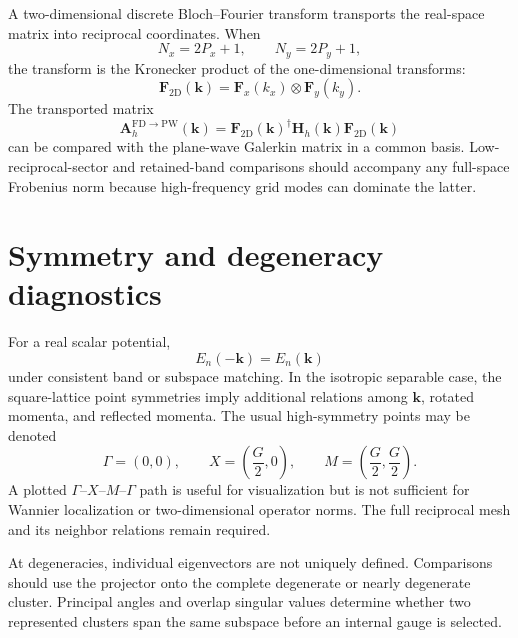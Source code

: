 A two-dimensional discrete Bloch--Fourier transform transports the real-space
matrix into reciprocal coordinates. When
\begin{equation}
    N_x=2P_x+1,
    \qquad
    N_y=2P_y+1,
\end{equation}
the transform is the Kronecker product of the one-dimensional transforms:
\begin{equation}
    \mathbf F_{2\mathrm D}(\mathbf k)
    =
    \mathbf F_x(k_x)\otimes\mathbf F_y(k_y).
\end{equation}
The transported matrix
\begin{equation}
    \mathbf A_h^{\mathrm{FD}\rightarrow\mathrm{PW}}(\mathbf k)
    =
    \mathbf F_{2\mathrm D}(\mathbf k)^\dagger
    \mathbf H_h(\mathbf k)
    \mathbf F_{2\mathrm D}(\mathbf k)
\end{equation}
can be compared with the plane-wave Galerkin matrix in a common basis.
Low-reciprocal-sector and retained-band comparisons should accompany any
full-space Frobenius norm because high-frequency grid modes can dominate the
latter.

\section*{Symmetry and degeneracy diagnostics}

For a real scalar potential,
\begin{equation}
    E_n(-\mathbf k)=E_n(\mathbf k)
\end{equation}
under consistent band or subspace matching. In the isotropic separable case,
the square-lattice point symmetries imply additional relations among
$\mathbf k$, rotated momenta, and reflected momenta. The usual high-symmetry
points may be denoted
\begin{equation}
    \Gamma=(0,0),
    \qquad
    X=\left(\frac{G}{2},0\right),
    \qquad
    M=\left(\frac{G}{2},\frac{G}{2}\right).
\end{equation}
A plotted $\Gamma$--$X$--$M$--$\Gamma$ path is useful for visualization but is
not sufficient for Wannier localization or two-dimensional operator norms. The
full reciprocal mesh and its neighbor relations remain required.

At degeneracies, individual eigenvectors are not uniquely defined. Comparisons
should use the projector onto the complete degenerate or nearly degenerate
cluster. Principal angles and overlap singular values determine whether two
represented clusters span the same subspace before an internal gauge is
selected.

